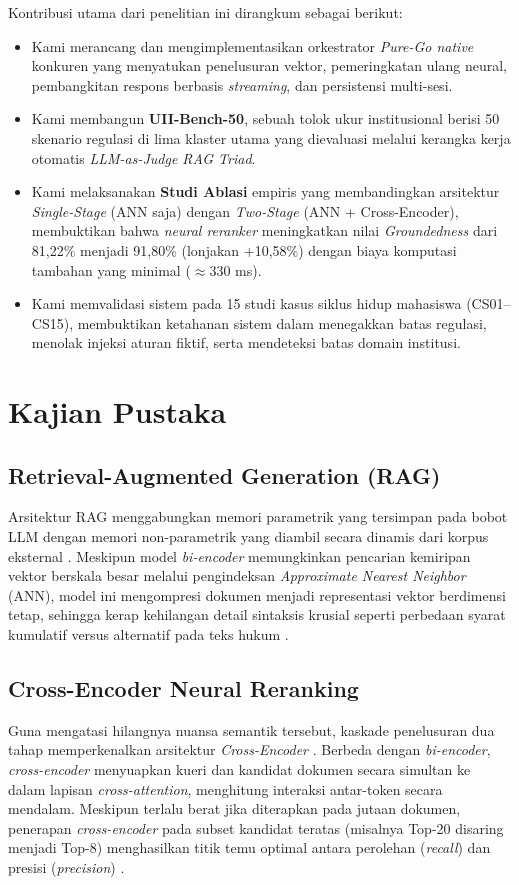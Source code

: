 \documentclass[conference]{IEEEtran}
\begin{document}
Kontribusi utama dari penelitian ini dirangkum sebagai berikut:
\begin{itemize}
    \item Kami merancang dan mengimplementasikan orkestrator \textit{Pure-Go native} konkuren yang menyatukan penelusuran vektor, pemeringkatan ulang neural, pembangkitan respons berbasis \textit{streaming}, dan persistensi multi-sesi.
    \item Kami membangun \textbf{UII-Bench-50}, sebuah tolok ukur institusional berisi 50 skenario regulasi di lima klaster utama yang dievaluasi melalui kerangka kerja otomatis \textit{LLM-as-Judge RAG Triad}.
    \item Kami melaksanakan \textbf{Studi Ablasi} empiris yang membandingkan arsitektur \textit{Single-Stage} (ANN saja) dengan \textit{Two-Stage} (ANN + Cross-Encoder), membuktikan bahwa \textit{neural reranker} meningkatkan nilai \textit{Groundedness} dari 81,22\% menjadi 91,80\% (lonjakan +10,58\%) dengan biaya komputasi tambahan yang minimal ($\approx$330 ms).
    \item Kami memvalidasi sistem pada 15 studi kasus siklus hidup mahasiswa (CS01--CS15), membuktikan ketahanan sistem dalam menegakkan batas regulasi, menolak injeksi aturan fiktif, serta mendeteksi batas domain institusi.
\end{itemize}

\section{Kajian Pustaka}

\subsection{Retrieval-Augmented Generation (RAG)}
Arsitektur RAG menggabungkan memori parametrik yang tersimpan pada bobot LLM dengan memori non-parametrik yang diambil secara dinamis dari korpus eksternal \cite{lewis2020retrieval, karpukhin2020dense}. Meskipun model \textit{bi-encoder} memungkinkan pencarian kemiripan vektor berskala besar melalui pengindeksan \textit{Approximate Nearest Neighbor} (ANN), model ini mengompresi dokumen menjadi representasi vektor berdimensi tetap, sehingga kerap kehilangan detail sintaksis krusial seperti perbedaan syarat kumulatif versus alternatif pada teks hukum \cite{reimers2019sentence}.

\subsection{Cross-Encoder Neural Reranking}
Guna mengatasi hilangnya nuansa semantik tersebut, kaskade penelusuran dua tahap memperkenalkan arsitektur \textit{Cross-Encoder} \cite{nogueira2019passage}. Berbeda dengan \textit{bi-encoder}, \textit{cross-encoder} menyuapkan kueri dan kandidat dokumen secara simultan ke dalam lapisan \textit{cross-attention}, menghitung interaksi antar-token secara mendalam. Meskipun terlalu berat jika diterapkan pada jutaan dokumen, penerapan \textit{cross-encoder} pada subset kandidat teratas (misalnya Top-20 disaring menjadi Top-8) menghasilkan titik temu optimal antara perolehan (\textit{recall}) dan presisi (\textit{precision}) \cite{gao2023retrieval}.
\end{document}
